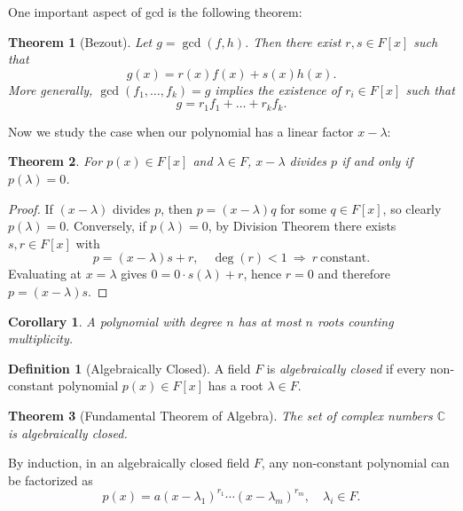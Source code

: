 \documentclass[11pt,openany]{book}
\theoremstyle{plain}
\newtheorem{theorem}{Theorem}[chapter]
\newtheorem{corollary}[corollary]{Corollary}
\theoremstyle{definition}
\newtheorem{definition}[definition]{Definition}
\theoremstyle{remark}
\begin{document}
One important aspect of gcd is the following theorem:
\begin{theorem} [Bezout]
Let $g = \gcd(f,h)$. Then there exist $r,s \in F[x]$ such that
\[
    g(x) = r(x)f(x) + s(x)h(x).
\]
More generally, $\gcd(f_1, \dots, f_k) = g$ implies the existence of $r_i \in F[x]$ such that
\[
    g = r_1 f_1 + \dots + r_k f_k.
\]
\end{theorem}

Now we study the case when our polynomial has a linear factor $x - \lambda$:
\begin{theorem}  
For $p(x) \in F[x]$ and $\lambda \in F$, $x - \lambda$ divides $p$ if and only if $p(\lambda) = 0$.
\end{theorem}
\begin{proof}  
If $(x - \lambda)$ divides $p$, then $p = (x - \lambda)q$ for some $q \in F[x]$, so clearly $p(\lambda) = 0$.  
Conversely, if $p(\lambda) = 0$, by Division Theorem there exists $s,r \in F[x]$ with
\[
    p = (x - \lambda)s + r, \quad \deg(r) < 1 \ \Rightarrow\ r \ \text{constant}.
\]
Evaluating at $x=\lambda$ gives $0 = 0 \cdot s(\lambda) + r$, hence $r=0$ and therefore $p = (x - \lambda)s$.
\end{proof}

\begin{corollary}  
A polynomial with degree $n$ has at most $n$ roots counting multiplicity.
\end{corollary}

\begin{definition} [Algebraically Closed] 
A field $F$ is \textit{algebraically closed} if every non-constant polynomial $p(x) \in F[x]$ has a root $\lambda \in F$.
\end{definition}

\begin{theorem} [Fundamental Theorem of Algebra]  
The set of complex numbers $\mathbb{C}$ is algebraically closed.
\end{theorem}

By induction, in an algebraically closed field $F$, any non-constant polynomial can be factorized as
\[
    p(x) = a(x - \lambda_1)^{r_1} \cdots (x - \lambda_m)^{r_m}, \quad \lambda_i \in F.
\]





\end{document}
